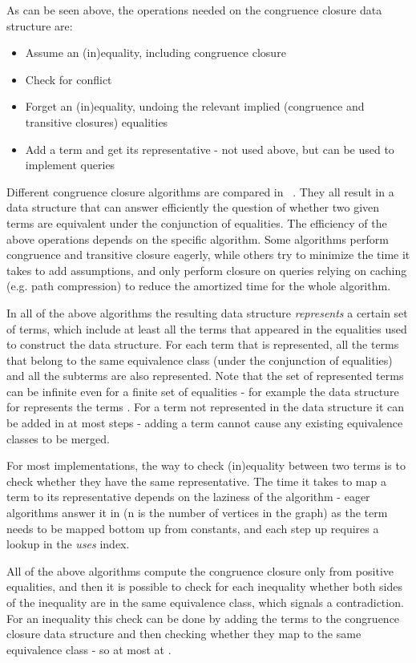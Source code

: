 As can be seen above, the operations needed on the congruence closure data structure are:
\begin{itemize}
	\item Assume an (in)equality, including congruence closure
	\item Check for conflict
	\item Forget an (in)equality, undoing the relevant implied (congruence and transitive closures) equalities
	\item Add a term and get its representative - not used above, but can be used to implement queries
\end{itemize}
Different congruence closure algorithms are compared in ~\cite{BachmairTiwari00}. They all result in a data structure that can answer efficiently the question of whether two given terms are equivalent under the conjunction of equalities.
The efficiency of the above operations depends on the specific algorithm. Some algorithms perform congruence and transitive closure eagerly, while others try to minimize the time it takes to add assumptions, and only perform closure on queries relying on caching (e.g. path compression) to reduce the amortized time for the whole algorithm.

In all of the above algorithms the resulting data structure \emph{represents} a certain set of terms, which include at least all the terms that appeared in the equalities used to construct the data structure. For each term that is represented, all the terms that belong to the same equivalence class (under the conjunction of equalities) and all the subterms are also represented. 
Note that the set of represented terms can be infinite even for a finite set of equalities - for example the data structure for  represents the terms . For a term  not represented in the data structure it can be added in at most  steps - adding a term cannot cause any existing equivalence classes to be merged.

For most implementations, the way to check (in)equality between two terms is to check whether they have the same representative.
The time it takes to map a term  to its representative depends on the laziness of the algorithm - eager algorithms answer it in  (n is the number of vertices in the graph) as the term needs to be mapped bottom up from constants, and each step up requires a lookup in the \emph{uses} index.

All of the above algorithms compute the congruence closure only from positive equalities, and then it is possible to check for each inequality whether both sides of the inequality are in the same equivalence class, which signals a contradiction. 
For an inequality  this check can be done by adding the terms  to the congruence closure data structure and then checking whether they map to the same equivalence class - so at most at .

